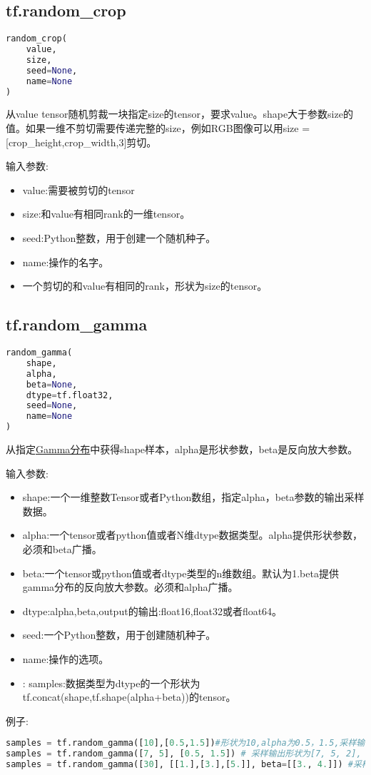 \subsection{tf.random\_crop}
\begin{lstlisting}[language=Python]
random_crop(
    value,
    size,
    seed=None,
    name=None
)
\end{lstlisting}
从value tensor随机剪裁一块指定size的tensor，要求value。shape大于参数size的值。如果一维不剪切需要传递完整的size，例如RGB图像可以用size = [crop\_height,crop\_width,3]剪切。

输入参数:
\begin{itemize}
\item value:需要被剪切的tensor
\item size:和value有相同rank的一维tensor。
\item seed:Python整数，用于创建一个随机种子。
\item name:操作的名字。
\item[Retuen] 一个剪切的和value有相同的rank，形状为size的tensor。
\end{itemize}
\subsection{tf.random\_gamma}
\begin{lstlisting}[language=Python]
random_gamma(
    shape,
    alpha,
    beta=None,
    dtype=tf.float32,
    seed=None,
    name=None
)
\end{lstlisting}
从指定\href{https://zh.wikipedia.org/wiki/伽玛分布}{Gamma分布}中获得shape样本，alpha是形状参数，beta是反向放大参数。

输入参数:
\begin{itemize}
\item shape:一个一维整数Tensor或者Python数组，指定alpha，beta参数的输出采样数据。
\item alpha:一个tensor或者python值或者N维dtype数据类型。alpha提供形状参数，必须和beta广播。
\item beta:一个tensor或python值或者dtype类型的n维数组。默认为1.beta提供gamma分布的反向放大参数。必须和alpha广播。
\item dtype:alpha,beta,output的输出:float16,float32或者float64。
\item seed:一个Python整数，用于创建随机种子。
\item name:操作的选项。
\item[Returns]:
samples:数据类型为dtype的一个形状为tf.concat(shape,tf.shape(alpha+beta))的tensor。
\end{itemize}
例子:
\begin{lstlisting}[language=Python]
samples = tf.random_gamma([10],[0.5,1.5])#形状为10,alpha为0.5，1.5,采样输出形状为[10,2]
samples = tf.random_gamma([7, 5], [0.5, 1.5]) # 采样输出形状为[7, 5, 2], where each slice [:, :, 0] and [:, :, 1] # 代表从两个分布采样的$7\items5$。
samples = tf.random_gamma([30], [[1.],[3.],[5.]], beta=[[3., 4.]]) #采样输出形状[30, 3, 2], 每$2\times2$（广播运算）30个采样点
\end{lstlisting}
